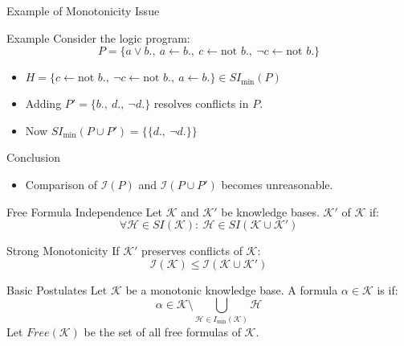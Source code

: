 \begin{frame}{Example of Monotonicity Issue}
    \begin{exampleblock}{Example}
        Consider the logic program:
        \[
            P = \{a \lor b.,\ a \leftarrow b.,\ c \leftarrow \text{not }b.,\ \neg c \leftarrow \text{not }b.\}
        \]
        \begin{itemize}
            \item \(H = \{c \leftarrow \text{not }b.,\ \neg c \leftarrow \text{not }b.,\ a \leftarrow b.\} \in SI_{\min}(P)\)
            \item Adding \(P' = \{b.,\ d.,\ \neg d.\}\) resolves conflicts in \(P\).
            \item Now \(SI_{\min}(P \cup P') = \{\{d.,\ \neg d.\}\}\)
        \end{itemize}
    \end{exampleblock}
    \begin{alertblock}{Conclusion}
        \begin{itemize}
            \item Comparison of \(\mathcal{I}(P)\) and \(\mathcal{I}(P \cup P')\) becomes unreasonable.
        \end{itemize}
    \end{alertblock}
\end{frame}

\begin{frame}{Free Formula Independence}
    Let \(\mathcal{K}\) and \(\mathcal{K}'\) be knowledge bases. \(\mathcal{K}'\)  of \(\mathcal{K}\) if:
    \[
        \forall \mathcal{H} \in SI(\mathcal{K}):\ \mathcal{H} \in SI(\mathcal{K} \cup \mathcal{K}')
    \]
    \begin{block}{Strong Monotonicity}
        If \(\mathcal{K}'\) preserves conflicts of \(\mathcal{K}\):
        \[
            \mathcal{I}(\mathcal{K}) \leq \mathcal{I}(\mathcal{K} \cup \mathcal{K}')
        \]
    \end{block}
\end{frame}

\begin{frame}{Basic Postulates}
    Let \(\mathcal{K}\) be a monotonic knowledge base. A formula \(\alpha \in \mathcal{K}\) is  if:
    \[
        \alpha \in \mathcal{K} \setminus \bigcup\limits_{\mathcal{H} \in I_{\min}(\mathcal{K})} \mathcal{H}
    \]
    Let \(Free(\mathcal{K})\) be the set of all free formulas of \(\mathcal{K}\).
\end{frame}

